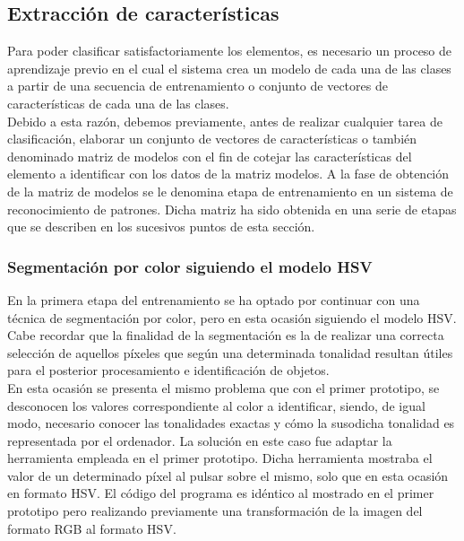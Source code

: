 \subsection{Extracción de características}

Para poder clasificar satisfactoriamente los elementos, es necesario un proceso de aprendizaje previo en el cual el sistema crea un modelo de cada una de las clases a partir de una secuencia de entrenamiento o conjunto de vectores de características de cada una de las clases.\\

Debido a esta razón, debemos previamente, antes de realizar cualquier tarea de clasificación, elaborar un conjunto de vectores de características o también denominado matriz de modelos con el fin de cotejar las características del elemento a identificar con los datos de la matriz modelos. A la fase de obtención de la matriz de modelos se le denomina etapa de entrenamiento en un sistema de reconocimiento de patrones. Dicha matriz ha sido obtenida en una serie de etapas que se describen en los sucesivos puntos de esta sección. 

\subsubsection {Segmentación por color siguiendo el modelo HSV}
\label{sec:color-HSV}

En la primera etapa del entrenamiento se ha optado por continuar con una técnica de segmentación por color, pero en esta ocasión siguiendo el modelo HSV. Cabe recordar que la finalidad de la segmentación es la de realizar una correcta selección de aquellos píxeles que según una determinada tonalidad resultan útiles para el posterior procesamiento e identificación de objetos.\\

En esta ocasión se presenta el mismo problema que con el primer prototipo, se desconocen los valores correspondiente al color a identificar, siendo, de igual modo, necesario conocer las tonalidades exactas y cómo la susodicha tonalidad es representada por el ordenador. La solución en este caso fue adaptar la herramienta empleada en el primer prototipo. Dicha herramienta mostraba el valor de un determinado píxel al pulsar sobre el mismo, solo que en esta ocasión en formato HSV.  El código del programa es idéntico al mostrado en el primer prototipo pero realizando previamente una transformación de la imagen del formato RGB al formato HSV.\\

